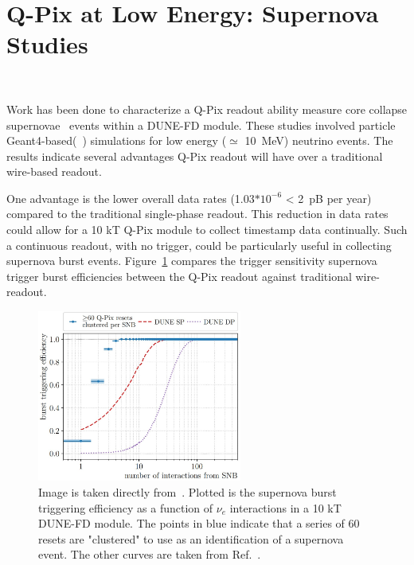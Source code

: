\section{Q-Pix at Low Energy: Supernova Studies}~\label{sec:qpix_supernova}

Work has been done to characterize a Q-Pix readout ability measure core collapse supernovae~\citep{qpix:shion} events within a DUNE-FD module.
These studies involved particle Geant4-based(~\citep{geant4:AGOSTINELLI2003250}) simulations for low energy ($\simeq$ 10~\unit{MeV}) neutrino events.
The results indicate several advantages Q-Pix readout will have over a traditional wire-based readout.

One advantage is the lower overall data rates (1.03$*10^{-6}$ < 2~\unit{pB} per year) compared to the traditional single-phase readout.
This reduction in data rates could allow for a 10 kT Q-Pix module to collect timestamp data continually.
Such a continuous readout, with no trigger, could be particularly useful in collecting supernova burst events.
Figure~\ref{fig:qpix_shion} compares the trigger sensitivity supernova trigger burst efficiencies between the Q-Pix readout against traditional wire-readout. 

\begin{figure}[]
\centering
\includegraphics[width=0.6\textwidth]{images/shion_qpix_snb_trigger.jpg}
\caption{Image is taken directly from~\citep{qpix:shion}.
Plotted is the supernova burst triggering efficiency as a function of $\nu_{e}$ interactions in a 10 kT DUNE-FD module.
The points in blue indicate that a series of 60 resets are "clustered" to use as an identification of a supernova event. 
The other curves are taken from Ref.~\citep{supernova_Abi_2021}.
}
\label{fig:qpix_shion}
\end{figure}